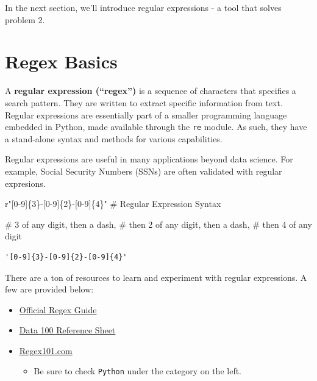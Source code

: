 \documentclass[
  letterpaper,
  DIV=11,
  numbers=noendperiod]{scrreprt}
\newenvironment{Shaded}{\begin{snugshade}}{\end{snugshade}}
\newcommand{\CommentTok}[1]{\textcolor[rgb]{0.37,0.37,0.37}{#1}}
\providecommand{\tightlist}{%
  \setlength{\itemsep}{0pt}\setlength{\parskip}{0pt}}\usepackage{longtable,booktabs,array}
\begin{document}
In the next section, we'll introduce regular expressions - a tool that
solves problem 2.

\hypertarget{regex-basics}{%
\section{Regex Basics}\label{regex-basics}}

A \textbf{regular expression (``regex'')} is a sequence of characters
that specifies a search pattern. They are written to extract specific
information from text. Regular expressions are essentially part of a
smaller programming language embedded in Python, made available through
the \texttt{re} module. As such, they have a stand-alone syntax and
methods for various capabilities.

Regular expressions are useful in many applications beyond data science.
For example, Social Security Numbers (SSNs) are often validated with
regular expresions.

\begin{Shaded}
\begin{Highlighting}[]
\CommentTok{r"[0{-}9]\{3\}{-}[0{-}9]\{2\}{-}[0{-}9]\{4\}"} \CommentTok{\# Regular Expression Syntax}

\CommentTok{\# 3 of any digit, then a dash,}
\CommentTok{\# then 2 of any digit, then a dash,}
\CommentTok{\# then 4 of any digit}
\end{Highlighting}
\end{Shaded}

\begin{verbatim}
'[0-9]{3}-[0-9]{2}-[0-9]{4}'
\end{verbatim}

There are a ton of resources to learn and experiment with regular
expressions. A few are provided below:

\begin{itemize}
\tightlist
\item
  \href{https://docs.python.org/3/howto/regex.html}{Official Regex
  Guide}
\item
  \href{https://ds100.org/sp22/resources/assets/hw/regex_reference.pdf}{Data
  100 Reference Sheet}
\item
  \href{https://regex101.com/}{Regex101.com}

  \begin{itemize}
  \tightlist
  \item
    Be sure to check \texttt{Python} under the category on the left.
  \end{itemize}
\end{itemize}
\end{document}
